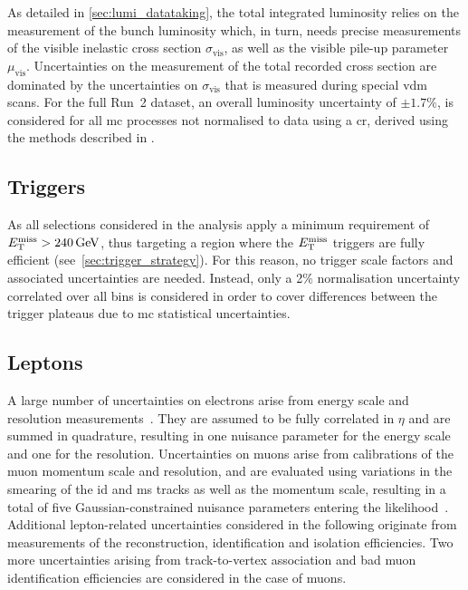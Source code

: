 As detailed in \cref{sec:lumi_datataking}, the total integrated luminosity relies on the measurement of the bunch luminosity which, in turn, needs precise measurements of the visible inelastic cross section $\sigma_\mathrm{vis}$, as well as the visible pile-up parameter $\mu_\mathrm{vis}$. Uncertainties on the measurement of the total recorded cross section are dominated by the uncertainties on $\sigma_\mathrm{vis}$ that is measured during special \gls{vdm} scans. For the full Run~2 dataset, an overall luminosity uncertainty of $\pm 1.7\%$, is considered for all \gls{mc} processes not normalised to data using a \gls{cr}, derived using the methods described in \cite{ATLAS-CONF-2019-021}.

\subsection{Triggers}

As all selections considered in the analysis apply a minimum requirement of $\etmiss > \SI{240}{\GeV}$, thus targeting a region where the $E_{\textrm{T}}^{\textrm{miss}}$ triggers are fully efficient (see~\cref{sec:trigger_strategy}). For this reason, no trigger scale factors and associated uncertainties are needed. Instead, only a 2\% normalisation uncertainty correlated over all bins is considered in order to cover differences between the trigger plateaus due to \gls{mc} statistical uncertainties. 

\subsection{Leptons}

A large number of uncertainties on electrons arise from energy scale and resolution measurements~\cite{EGAM-2018-01,PERF-2017-01}. They are assumed to be fully correlated in $\eta$ and are summed in quadrature, resulting in one nuisance parameter for the energy scale and one for the resolution. Uncertainties on muons arise from calibrations of the muon momentum scale and resolution, and are evaluated using variations in the smearing of the \gls{id} and \gls{ms} tracks as well as the momentum scale, resulting in a total of five Gaussian-constrained nuisance parameters entering the likelihood~\cite{PERF-2015-10}. Additional lepton-related uncertainties considered in the following originate from measurements of the reconstruction, identification and isolation efficiencies. Two more uncertainties arising from track-to-vertex association and bad muon identification efficiencies are considered in the case of muons.


